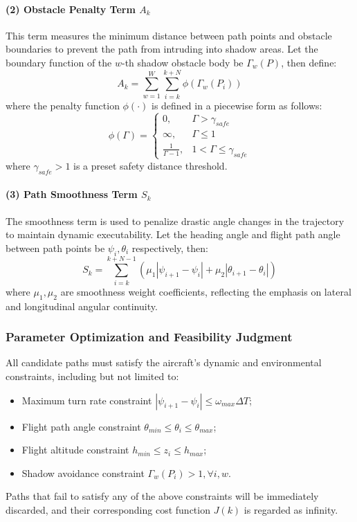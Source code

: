 \documentclass[final,3p,times,numbers]{elsarticle}
\begin{document}
\paragraph{(2) Obstacle Penalty Term $A_k$}
This term measures the minimum distance between path points and obstacle boundaries to prevent the path from intruding into shadow areas. Let the boundary function of the $w$-th shadow obstacle body be $\Gamma_w(P)$, then define:
\begin{equation}
A_k = \sum_{w=1}^{W} \sum_{i=k}^{k+N} \phi(\Gamma_w(P_i)) \label{eq:3-14}
\end{equation}
where the penalty function $\phi(\cdot)$ is defined in a piecewise form as follows:
\begin{equation}
\phi(\Gamma) = \begin{cases} 
0, & \Gamma > \gamma_{safe} \\ 
\infty, & \Gamma \le 1 \\ 
\frac{1}{\Gamma-1}, & 1 < \Gamma \le \gamma_{safe} 
\end{cases} \label{eq:3-15}
\end{equation}
where $\gamma_{safe} > 1$ is a preset safety distance threshold.

\paragraph{(3) Path Smoothness Term $S_k$}
The smoothness term is used to penalize drastic angle changes in the trajectory to maintain dynamic executability. Let the heading angle and flight path angle between path points be $\psi_i, \theta_i$ respectively, then:
\begin{equation}
S_k = \sum_{i=k}^{k+N-1} (\mu_1 |\psi_{i+1} - \psi_i| + \mu_2 |\theta_{i+1} - \theta_i|) \label{eq:3-16}
\end{equation}
where $\mu_1, \mu_2$ are smoothness weight coefficients, reflecting the emphasis on lateral and longitudinal angular continuity.

\subsubsection{Parameter Optimization and Feasibility Judgment}
All candidate paths must satisfy the aircraft's dynamic and environmental constraints, including but not limited to:
\begin{itemize}
    \item Maximum turn rate constraint $|\psi_{i+1} - \psi_i| \le \omega_{max}\Delta T$;
    \item Flight path angle constraint $\theta_{min} \le \theta_i \le \theta_{max}$;
    \item Flight altitude constraint $h_{min} \le z_i \le h_{max}$;
    \item Shadow avoidance constraint $\Gamma_w(P_i) > 1, \forall i, w$.
\end{itemize}
Paths that fail to satisfy any of the above constraints will be immediately discarded, and their corresponding cost function $J(k)$ is regarded as infinity.
\end{document}
